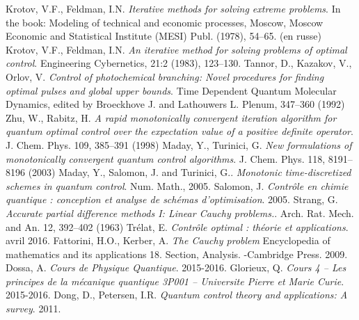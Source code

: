 

\begin{thebibliography}{KNU90}
 Krotov, V.F., Feldman, I.N.
\emph{Iterative methods for solving extreme problems}. In the
book: Modeling of technical and economic processes, Moscow, Moscow Economic and Statistical Institute (MESI) Publ. (1978), 54–65. (en russe)
\vspace{0.5cm}
 Krotov, V.F., Feldman, I.N.
\emph{An iterative method for solving problems of optimal control}. Engineering Cybernetics, 21:2 (1983), 123–130.
\vspace{0.5cm}
 Tannor, D., Kazakov, V., Orlov, V.
\emph{Control of photochemical branching: Novel procedures for finding optimal pulses and global upper bounds}. Time Dependent Quantum Molecular Dynamics, edited by Broeckhove J. and Lathouwers L. Plenum, 347–360 (1992)
\vspace{0.5cm}
 Zhu, W., Rabitz, H.
\emph{A rapid monotonically convergent iteration algorithm for quantum optimal control over the expectation value of a positive definite operator}. J. Chem. Phys. 109, 385–391 (1998)
\vspace{0.5cm}
 Maday, Y., Turinici, G. 
\emph{New formulations of monotonically convergent quantum control algorithms}. J. Chem. Phys. 118, 8191–8196 (2003)
\vspace{0.5cm}
 Maday, Y., Salomon, J. and Turinici, G..
\emph{Monotonic time-discretized schemes in quantum control}. Num. Math., 2005.
\vspace{0.5cm}
 Salomon, J.
\emph{Contrôle en chimie quantique : conception et analyse de schémas d’optimisation}. 2005.
\vspace{0.5cm}
 Strang, G. 
\emph{Accurate partial difference methods I: Linear Cauchy problems.}. Arch. Rat. Mech. and An. 12, 392–402 (1963)
\vspace{0.5cm}
 Trélat, E.
\emph{Contrôle optimal : théorie et applications}. avril 2016.
\vspace{0.5cm}
 Fattorini, H.O., Kerber, A.
\emph{The Cauchy problem} Encyclopedia of mathematics and its applications 18. Section, Analysis. -Cambridge Press. 2009.
\vspace{0.5cm}
 Dossa, A.
\emph{Cours de Physique Quantique}. 2015-2016.
\vspace{0.5cm}
 Glorieux, Q.
\emph{Cours 4 – Les principes de la mécanique quantique
3P001 – Universite Pierre et Marie Curie}. 2015-2016.
\vspace{0.5cm}
 Dong, D., Petersen, I.R.
\emph{Quantum control theory and applications: A survey}. 2011.
\end{thebibliography}
